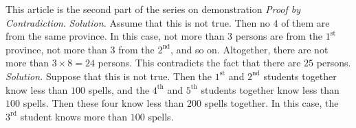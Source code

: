 \begin{multicols}{2}
	This article is the second part of the series on demonstration \textit{Proof by Contradiction}.
	\vskip 0.2cm
	\vskip 0.2cm
	\textit{Solution.}
	Assume that this is not true. Then no $4$ of them are from the same province.
	In this case, not more than $3$ persons are from the $1^{\text{st}}$ province, not more than $3$ from the $2^{\text{nd}}$, and so on.
	Altogether, there are not more than $3 \times 8 = 24$ persons. This contradicts the fact that there are $25$ persons.
	\vskip 0.2cm
	\vskip 0.1cm
	\textit{Solution.}
	Suppose that this is not true. Then the $1^{\text{st}}$ and $2^{\text{nd}}$ students together know less than $100$ spells,
	and the $4^{\text{th}}$ and $5^{\text{th}}$ students together know less than $100$ spells.
	Then these four know less than $200$ spells together. In this case, the $3^{\text{rd}}$ student knows more than $100$ spells.
	\vskip 0.2cm
	

\end{multicols}
